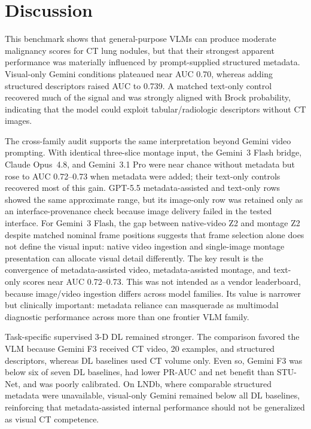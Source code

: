\documentclass[11pt]{article}
\begin{document}
\section{Discussion}\label{sec:discussion}

This benchmark shows that general-purpose VLMs can produce moderate malignancy scores for CT lung nodules, but that their strongest apparent performance was materially influenced by prompt-supplied structured metadata. Visual-only Gemini conditions plateaued near AUC 0.70, whereas adding structured descriptors raised AUC to 0.739. A matched text-only control recovered much of the signal and was strongly aligned with Brock probability, indicating that the model could exploit tabular/radiologic descriptors without CT images.

The cross-family audit supports the same interpretation beyond Gemini video prompting. With identical three-slice montage input, the Gemini~3 Flash bridge, Claude Opus~4.8, and Gemini~3.1 Pro were near chance without metadata but rose to AUC 0.72--0.73 when metadata were added; their text-only controls recovered most of this gain. GPT-5.5 metadata-assisted and text-only rows showed the same approximate range, but its image-only row was retained only as an interface-provenance check because image delivery failed in the tested interface. For Gemini~3 Flash, the gap between native-video Z2 and montage Z2 despite matched nominal frame positions suggests that frame selection alone does not define the visual input: native video ingestion and single-image montage presentation can allocate visual detail differently. The key result is the convergence of metadata-assisted video, metadata-assisted montage, and text-only scores near AUC 0.72--0.73. This was not intended as a vendor leaderboard, because image/video ingestion differs across model families. Its value is narrower but clinically important: metadata reliance can masquerade as multimodal diagnostic performance across more than one frontier VLM family.

Task-specific supervised 3-D DL remained stronger. The comparison favored the VLM because Gemini F3 received CT video, 20 examples, and structured descriptors, whereas DL baselines used CT volume only. Even so, Gemini F3 was below six of seven DL baselines, had lower PR-AUC and net benefit than STU-Net, and was poorly calibrated. On LNDb, where comparable structured metadata were unavailable, visual-only Gemini remained below all DL baselines, reinforcing that metadata-assisted internal performance should not be generalized as visual CT competence.
\end{document}
